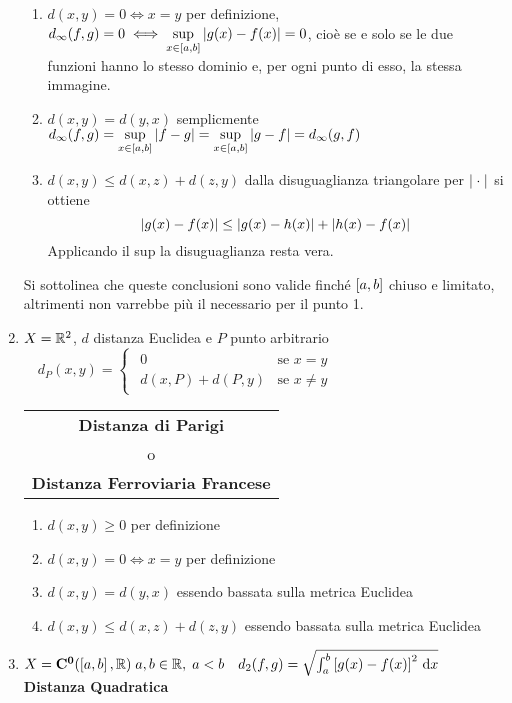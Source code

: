 \begin{example}
\begin{enumerate}
\begin{enumerate}[label=\arabic*.]
				\item $d(x,y) = 0 \iff x = y$ per definizione, $d_\infty(f,g) = 0 \iff \sup\limits_{x\in\left[a,b\right]}\left|g(x)-f(x)\right| = 0$, cioè se e solo se le due funzioni hanno lo stesso dominio e, per ogni punto di esso, la stessa immagine.
				\item $d(x,y)=d(y,x)$ semplicmente $d_{\infty}(f,g) = \sup\limits_{x\in\left[a,b\right]}\left|f-g\right| = \sup\limits_{x\in\left[a,b\right]}\left|g-f\right| = d_{\infty}(g,f)$
				\item $d(x,y) \leq d(x,z) + d(z,y)$ dalla disuguaglianza triangolare per $\left|\;\cdot\;\right|$ si ottiene
					\[\left|g(x)-f(x)\right|\le\left|g(x)-h(x)\right|+\left|h(x)-f(x)\right|\]
					Applicando il sup la disuguaglianza resta vera.
			\end{enumerate}
			\begin{note}
				Si sottolinea che queste conclusioni sono valide finché $\left[a,b\right]$ chiuso e limitato, altrimenti non varrebbe più il  necessario per il punto 1. %
			\end{note}
		\item $X=\mathbb{R}^2$, $d$ distanza Euclidea e $P$ punto arbitrario\newline
			$\quad d_P(x,y)=
			\begin{cases}
				\begin{array}{ll}
					0 & \text{se } x = y\\
					d(x,P) + d(P,y) & \text{se } x \neq y
				\end{array}
			\end{cases}$ \hfill
			{\footnotesize
				\begin{tabular}{c}
					\textbf{Distanza di Parigi}\\[-1ex]
					o\\[-1ex]
					\textbf{Distanza Ferroviaria Francese}
				\end{tabular}
			} \label{ex:dist_parigi}
			\begin{enumerate}[label=\arabic*.]
				\item $d(x,y) \geq 0$ per definizione
				\item $d(x,y) = 0 \iff x = y$ per definizione
				\item $d(x,y)=d(y,x)$ essendo bassata sulla metrica Euclidea
				\item $d(x,y) \leq d(x,z) + d(z,y)$ essendo bassata sulla metrica Euclidea
			\end{enumerate}
		\item $X=\mathbf{C^{0}}(\left[a,b\right],\mathbb{R})\;a,b\in\mathbb{R},\;a<b \quad d_2(f,g) = \sqrt{\int_a^b\left[g(x)-f(x)\right]^2 \,\mathrm{d}{x}}$ \hfill {\footnotesize\textbf{Distanza Quadratica}}

\end{enumerate}
\end{example}
